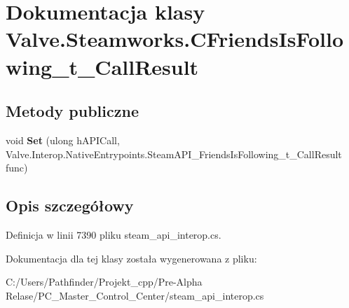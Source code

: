 \hypertarget{class_valve_1_1_steamworks_1_1_c_friends_is_following__t___call_result}{}\section{Dokumentacja klasy Valve.\+Steamworks.\+C\+Friends\+Is\+Following\+\_\+t\+\_\+\+Call\+Result}
\label{class_valve_1_1_steamworks_1_1_c_friends_is_following__t___call_result}
\subsection*{Metody publiczne}
\begin{DoxyCompactItemize}
\item 
\mbox{\label{class_valve_1_1_steamworks_1_1_c_friends_is_following__t___call_result_ac785f2646f681cce164794b1dac64e52}} 
void {\bfseries Set} (ulong h\+A\+P\+I\+Call, Valve.\+Interop.\+Native\+Entrypoints.\+Steam\+A\+P\+I\+\_\+\+Friends\+Is\+Following\+\_\+t\+\_\+\+Call\+Result func)
\end{DoxyCompactItemize}


\subsection{Opis szczegółowy}


Definicja w linii 7390 pliku steam\+\_\+api\+\_\+interop.\+cs.



Dokumentacja dla tej klasy została wygenerowana z pliku\+:\begin{DoxyCompactItemize}
\item 
C\+:/\+Users/\+Pathfinder/\+Projekt\+\_\+cpp/\+Pre-\/\+Alpha Relase/\+P\+C\+\_\+\+Master\+\_\+\+Control\+\_\+\+Center/steam\+\_\+api\+\_\+interop.\+cs\end{DoxyCompactItemize}

